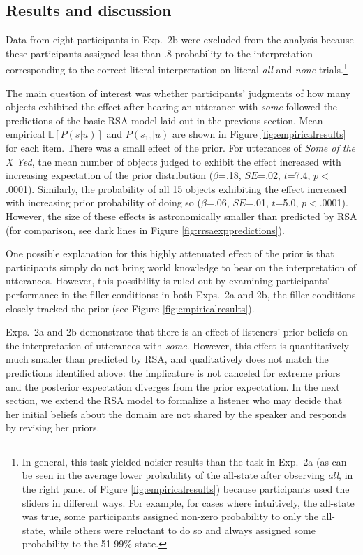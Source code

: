 \documentclass[10pt,letterpaper]{article}
\newcommand{\figref}[1]{Figure \ref{#1}}
\begin{document}
 
 \subsection{Results and discussion}

Data from eight participants in Exp.~2b were excluded from the analysis because these participants assigned less than .8 probability to the interpretation corresponding to the correct literal interpretation on literal \emph{all} and \emph{none} trials.\footnote{In general, this task yielded noisier results than the task in Exp.~2a (as can be seen in the average lower probability of the all-state after observing \emph{all}, in the right panel of \figref{fig:empiricalresults}) because participants used the sliders in different ways. For example, for cases where intuitively, the all-state was true, some participants assigned non-zero probability to only the all-state, while others were reluctant to do so and always assigned some probability to the 51-99\% state.} 

The main question of interest was whether participants' judgments of how many objects exhibited the effect after hearing an utterance with \emph{some} followed the predictions of the basic RSA model laid out in the previous section. Mean empirical $\mathbb{E}[P(s|u)]$ and $P(s_{15}|u)$ are shown in \figref{fig:empiricalresults} for each item. There was a small effect of the prior. For utterances of \emph{Some of the X Yed}, the mean number of objects judged to exhibit the effect increased with increasing expectation of the prior distribution ($\beta$=.18, $SE$=.02, $t$=7.4, $p$$<$.0001). Similarly, the probability of all 15 objects exhibiting the effect increased with increasing prior probability of doing so ($\beta$=.06, $SE$=.01, $t$=5.0, $p$$<$.0001). However, the size of these effects is astronomically smaller than predicted by RSA (for comparison, see dark lines in \figref{fig:rrsaexppredictions}).%

One possible explanation for this highly attenuated effect of the prior is that participants simply do not bring world knowledge to bear on the interpretation of utterances. However, this possibility is ruled out by examining participants' performance in the filler conditions: in both Exps.~2a and 2b, the filler conditions closely tracked the prior (see \figref{fig:empiricalresults}). 

Exps.~2a and 2b demonstrate that there is an effect of listeners' prior beliefs on the interpretation of utterances with \emph{some}. However, this effect is quantitatively much smaller than predicted by RSA, and qualitatively does not match the predictions identified above: the implicature is not canceled for extreme priors and the posterior expectation diverges from the prior expectation.
In the next section, we extend the RSA model to formalize a listener who may decide that her initial beliefs about the domain are not shared by the speaker and responds by revising her priors.
\end{document}
